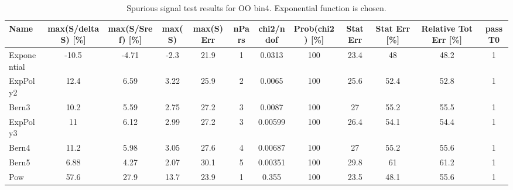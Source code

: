 \begin{landscape}
\begin{table}[]
\footnotesize
\begin{tabular}{l|ccccccccccc}
Name        & max(S/deltaS) {[}\%{]} & max(S/Sref) {[}\%{]} & max(S) & max(S) Err & nPars & chi2/ndof & Prob(chi2) {[}\%{]} & Stat Err & Stat Err {[}\%{]} & Relative Tot Err {[}\%{]} & passT0 \\ \hline
Exponential & -10.5                  & -4.71                & -2.3   & 21.9       & 1     & 0.0313    & 100                 & 23.4     & 48                & 48.2                      & 1      \\
ExpPoly2    & 12.4                   & 6.59                 & 3.22   & 25.9       & 2     & 0.0065    & 100                 & 25.6     & 52.4              & 52.8                      & 1      \\
Bern3       & 10.2                   & 5.59                 & 2.75   & 27.2       & 3     & 0.0087    & 100                 & 27       & 55.2              & 55.5                      & 1      \\
ExpPoly3    & 11                     & 6.12                 & 2.99   & 27.2       & 3     & 0.00599   & 100                 & 26.4     & 54.1              & 54.4                      & 1      \\
Bern4       & 11.2                   & 5.98                 & 3.05   & 27.6       & 4     & 0.00687   & 100                 & 27       & 55.2              & 55.6                      & 1      \\
Bern5       & 6.88                   & 4.27                 & 2.07   & 30.1       & 5     & 0.00351   & 100                 & 29.8     & 61                & 61.2                      & 1      \\
Pow         & 57.6                   & 27.9                 & 13.7   & 23.9       & 1     & 0.355     & 100                 & 23.5     & 48.1              & 55.6                      & 1      \\
\end{tabular}
\caption{Spurious signal test results for OO bin4. Exponential function is chosen.}
\label{tab:SSbin4}
\end{table}


\end{landscape}
